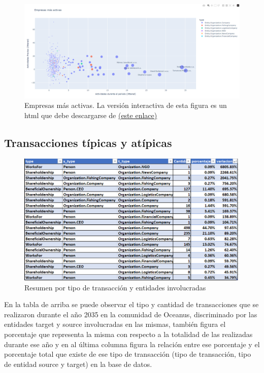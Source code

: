 \documentclass[11pt,spanish,a4paper]{article}
\begin{document}
\begin{figure}[H]
    \centering
    \includegraphics[width=0.9\linewidth]{graphs/ejercicio_1_1.png}
    \caption{Empresas más activas. La versión interactiva de esta figura es un html que debe descargarse de \href{https://github.com/bettachini/visualizacion/blob/main/vast2024/reporte/graphs/scatter_plot_degree_in_vs_out_period_companies_jitter.html}{(este enlace)}}
    \label{fig:enter-label}
\end{figure}


\subsection{Transacciones típicas y atípicas}

\begin{figure}[H]
    \centering
    \includegraphics[width=0.7\linewidth]{graphs/ejercicio_2_0_.png}
    \caption{Resumen por tipo de transacción y entidades involucradas}
    \label{fig:enter-label}
\end{figure}

En la tabla de arriba se puede observar el tipo y cantidad de transacciones que se realizaron durante el año 2035 en la comunidad de Oceanus, discriminado por las entidades target y source involucradas en las mismas, también figura el porcentaje que representa la misma con respecto a la totalidad de las realizadas durante ese año y en al última columna figura la relación entre ese porcentaje y el porcentaje total que existe de ese tipo de transacción (tipo de transacción, tipo de entidad source y target) en la base de datos.
\end{document}
